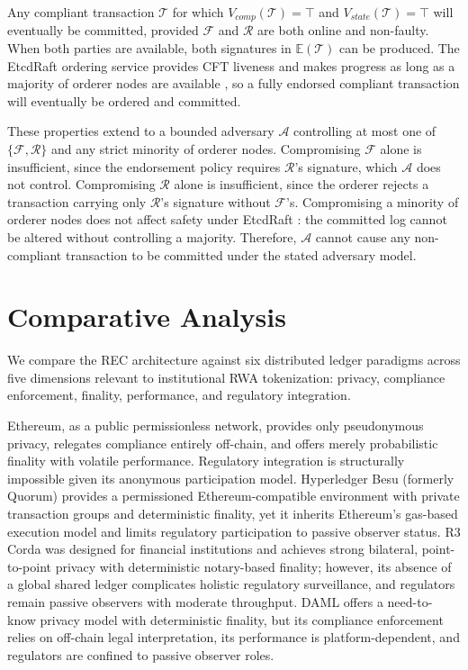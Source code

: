 \documentclass[journal,10pt,twocolumn]{IEEEtran}
\begin{document}
Any compliant transaction $\mathcal{T}$ for which $V_{comp}(\mathcal{T}) = \top$ and $V_{state}(\mathcal{T}) = \top$ will eventually be committed, provided $\mathcal{F}$ and $\mathcal{R}$ are both online and non-faulty. When both parties are available, both signatures in $\mathbb{E}(\mathcal{T})$ can be produced. The EtcdRaft ordering service provides CFT liveness and makes progress as long as a majority of orderer nodes are available \cite{ref:raft}, so a fully endorsed compliant transaction will eventually be ordered and committed.

These properties extend to a bounded adversary $\mathcal{A}$ controlling at most one of $\{\mathcal{F}, \mathcal{R}\}$ and any strict minority of orderer nodes. Compromising $\mathcal{F}$ alone is insufficient, since the endorsement policy requires $\mathcal{R}$'s signature, which $\mathcal{A}$ does not control. Compromising $\mathcal{R}$ alone is insufficient, since the orderer rejects a transaction carrying only $\mathcal{R}$'s signature without $\mathcal{F}$'s. Compromising a minority of orderer nodes does not affect safety under EtcdRaft \cite{ref:raft}: the committed log cannot be altered without controlling a majority. Therefore, $\mathcal{A}$ cannot cause any non-compliant transaction to be committed under the stated adversary model.

\section{Comparative Analysis}
\label{sec:comparison}

We compare the REC architecture against six distributed ledger paradigms across five dimensions relevant to institutional RWA tokenization: privacy, compliance enforcement, finality, performance, and regulatory integration.

Ethereum, as a public permissionless network, provides only pseudonymous privacy, relegates compliance entirely off-chain, and offers merely probabilistic finality with volatile performance. Regulatory integration is structurally impossible given its anonymous participation model. Hyperledger Besu (formerly Quorum) provides a permissioned Ethereum-compatible environment with private transaction groups and deterministic finality, yet it inherits Ethereum's gas-based execution model and limits regulatory participation to passive observer status. R3 Corda was designed for financial institutions and achieves strong bilateral, point-to-point privacy with deterministic notary-based finality; however, its absence of a global shared ledger complicates holistic regulatory surveillance, and regulators remain passive observers with moderate throughput. DAML offers a need-to-know privacy model with deterministic finality, but its compliance enforcement relies on off-chain legal interpretation, its performance is platform-dependent, and regulators are confined to passive observer roles.
\end{document}
